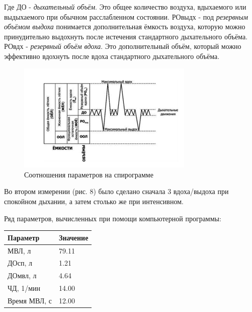 \documentclass{article}
\begin{document}
            Где ДО - \textit{дыхательный объём}. Это общее количество воздуха, вдыхаемого
            или выдыхаемого при обычном расслабленном состоянии. РО{выдх} - под \textit{резервным объёмом выдоха} понимается
            дополнительная ёмкость воздуха, которую можно принудительно выдохнуть после истечения
            стандартного дыхательного объёма. РО{вдх} - \textit{резервный объём вдоха}. Это дополнительный
            объём, который можно эффективно вдохнуть после вдоха стандартного
            дыхательного объёма.

            \begin{figure}[h]
                \centering
                \includegraphics*[width=0.75\textwidth]{СоотношенияСпирограммы.png}
                \caption{Соотношения параметров на спирограмме}
            \end{figure}

            \hspace*{4mm} Во втором измерении (рис. 8) было сделано сначала 3 вдоха/выдоха
            при спокойном дыхании, а затем столько же при интенсивном.
            \vspace*{4mm}

            Ряд параметров, вычисленных при помощи компьютерной программы:

            \begin{center}
                \begin{tabular}{|l|l|}
                    \hline
                    Параметр & Значение \\ \hline
                    МВЛ, л & 79.11 \\ \hline
                    ДО{сп}, л & 1.21 \\ \hline
                    ДО{мвл}, л & 4.64 \\ \hline
                    ЧД, 1/мин & 14.00  \\ \hline
                    Время МВЛ, с & 12.00 \\ \hline
                \end{tabular}
            \end{center}
\end{document}
